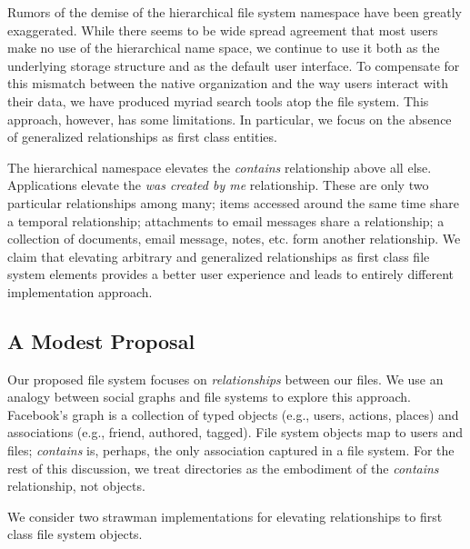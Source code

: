 Rumors of the demise of the hierarchical file system namespace have been
greatly exaggerated.
While there seems to be wide spread agreement that most users make no use
of the hierarchical name space, we continue to use it both as the underlying
storage structure and as the default user interface.
To compensate for this mismatch between the native organization and the
way users interact with their data,
we have produced myriad search tools atop the file system.
This approach, however, has some limitations.
In particular, we focus on the absence of generalized relationships
as first class entities.

The hierarchical namespace elevates the \emph{contains} relationship
above all else.
Applications elevate the \emph{was created by me} relationship.
These are only two particular relationships among many;
items accessed around the same time share a temporal relationship;
attachments to email messages share a relationship;
a collection of documents, email message, notes, etc. form another
relationship.
We claim that elevating arbitrary and generalized relationships as first class
file system elements provides a better user experience and leads to entirely
different implementation approach.

\subsection{A Modest Proposal}
\label{hotos19:graphfs}


Our proposed file system focuses on \textit{relationships} between our files.
We use an analogy between social graphs and file systems to explore this
approach.
Facebook's graph is a collection of typed objects
(e.g., users, actions, places) and associations (e.g., friend, authored, tagged).
File system objects map to users and files; \textit{contains} is, perhaps, the only
association captured in a file system.
For the rest of this discussion, we treat directories as the embodiment of the
\emph{contains} relationship, not objects.

We consider two strawman implementations for elevating relationships to
first class file system objects.

